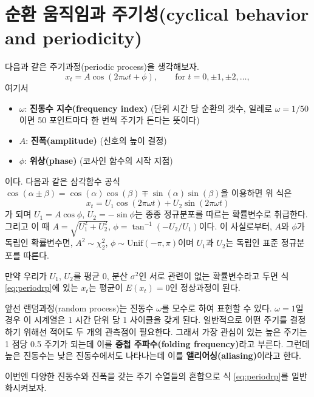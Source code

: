\documentclass[b5paper,]{scrbook}
\theoremstyle{plain}
\theoremstyle{definition}
\numberwithin{equation}{section}
\begin{document}
\hypertarget{--cyclical-behavior-and-periodicity}{%
\section{순환 움직임과 주기성(cyclical behavior and periodicity)}\label{--cyclical-behavior-and-periodicity}}

다음과 같은 주기과정(periodic process)을 생각해보자.
\[x_{t}=A\cos(2\pi\omega t + \phi), \qquad{\text{for } t=0,\pm 1, \pm 2, \ldots,}\]
여기서

\begin{itemize}
\item
  \(\omega\): \textbf{진동수 지수(frequency index)} (단위 시간 당 순환의 갯수, 일례로 \(\omega=1/50\)이면 50 포인트마다 한 번씩 주기가 돈다는 뜻이다)
\item
  \(A\): \textbf{진폭(amplitude)} (신호의 높이 결정)
\item
  \(\phi\): \textbf{위상(phase)} (코사인 함수의 시작 지점)
\end{itemize}

이다. 다음과 같은 삼각함수 공식 \(\cos (\alpha \pm \beta)= \cos (\alpha) \cos (\beta) \mp \sin(\alpha)\sin(\beta)\)을 이용하면 위 식은
\begin{equation}
x_{t}=U_{1}\cos(2\pi\omega t) + U_{2}\sin(2\pi\omega t)
\label{eq:periodrp}
\end{equation}
가 되며 \(U_{1}=A\cos \phi\), \(U_{2}=-\sin\phi\)는 종종 정규분포를 따르는 확률변수로 취급한다. 그리고 이 때 \(A=\sqrt{U_{1}^{2}+U_{2}^{2}}\), \(\phi=\tan^{-1}(-U_{2}/U_{1})\)이다. 이 사실로부터, \(A\)와 \(\phi\)가 독립인 확률변수면, \(A^{2}\sim \chi_{2}^{2}\), \(\phi \sim \text{Unif}(-\pi, \pi)\)이며 \(U_{1}\)과 \(U_{2}\)는 독립인 표준 정규분포를 따른다.

만약 우리가 \(U_{1}\), \(U_{2}\)를 평균 0, 분산 \(\sigma^{2}\)인 서로 관련이 없는 확률변수라고 두면 식 \eqref{eq:periodrp}에 있는 \(x_{t}\)는 평균이 \(E(x_{t})=0\)인 정상과정이 된다.

앞선 랜덤과정(random process)는 진동수 \(\omega\)를 모수로 하여 표현할 수 있다. \(\omega=1\)일 경우 이 시계열은 1 시간 단위 당 1 사이클을 갖게 된다. 일반적으로 어떤 주기를 결정하기 위해선 적어도 두 개의 관측점이 필요한다. 그래서 가장 관심이 있는 높은 주기는 1 점당 0.5 주기가 되는데 이를 \textbf{중첩 주파수(folding frequency)}라고 부른다. 그런데 높은 진동수는 낮은 진동수에서도 나타나는데 이를 \textbf{앨리어싱(aliasing)}이라고 한다.

이번엔 다양한 진동수와 진폭을 갖는 주기 수열들의 혼합으로 식 \eqref{eq:periodrp}를 일반화시켜보자.
\end{document}
